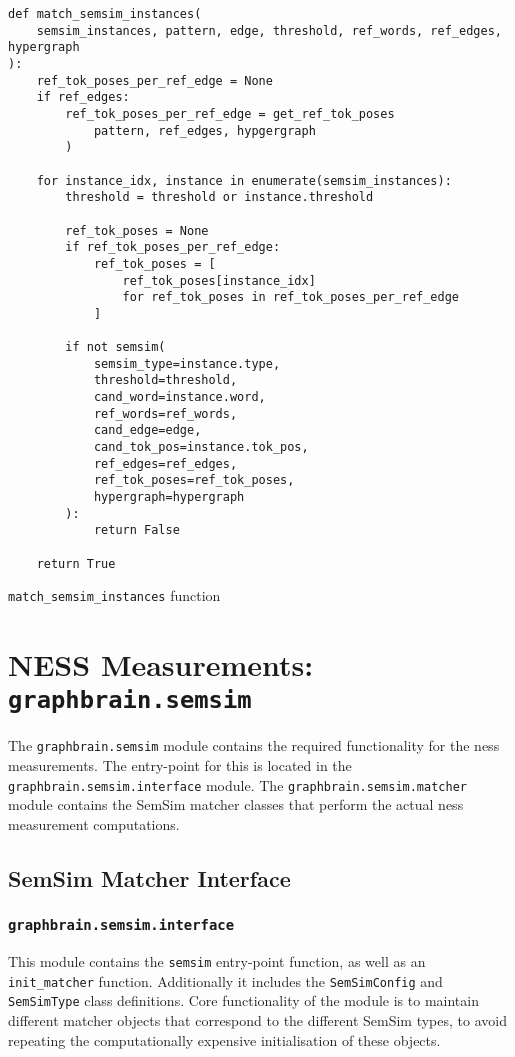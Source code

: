 \documentclass[11pt, numbers=noenddot]{scrreprt}
\begin{document}
\begin{pseudo}
\begin{lstlisting}
def match_semsim_instances(
    semsim_instances, pattern, edge, threshold, ref_words, ref_edges, hypergraph
):
    ref_tok_poses_per_ref_edge = None
    if ref_edges:
        ref_tok_poses_per_ref_edge = get_ref_tok_poses
            pattern, ref_edges, hypgergraph
        ) 
   
    for instance_idx, instance in enumerate(semsim_instances):
        threshold = threshold or instance.threshold

        ref_tok_poses = None
        if ref_tok_poses_per_ref_edge:
            ref_tok_poses = [
                ref_tok_poses[instance_idx]
                for ref_tok_poses in ref_tok_poses_per_ref_edge
            ]

        if not semsim(
            semsim_type=instance.type,
            threshold=threshold,
            cand_word=instance.word,
            ref_words=ref_words,
            cand_edge=edge,
            cand_tok_pos=instance.tok_pos,
            ref_edges=ref_edges,
            ref_tok_poses=ref_tok_poses,
            hypergraph=hypergraph
        ):
            return False

    return True
\end{lstlisting}
\caption{\texttt{match\_semsim\_instances} function}
\label{psd:match-semsim-instancess-function}
\end{pseudo}

 
\section{NESS Measurements: \texttt{graphbrain.semsim}}
The \texttt{graphbrain.semsim} module contains the required functionality for the \gls{ness} measurements. The entry-point for this is located in the \texttt{graphbrain.semsim.interface} module. The \texttt{graphbrain.semsim.matcher} module contains the SemSim matcher classes that perform the actual \gls{ness} measurement computations.


\subsection{SemSim Matcher Interface}

\subsubsection{\texttt{graphbrain.semsim.interface}}
\label{sec:graphbrain.semsim.interface}
\label{sec:ness-config}
This module contains the \texttt{semsim} entry-point function, as well as an \texttt{init\_matcher} function. Additionally it includes the  
\texttt{SemSimConfig} and \texttt{SemSimType} class definitions. Core functionality of the module is to maintain different matcher objects that correspond to the different SemSim types, to avoid repeating the computationally expensive initialisation of these objects.
\end{document}
